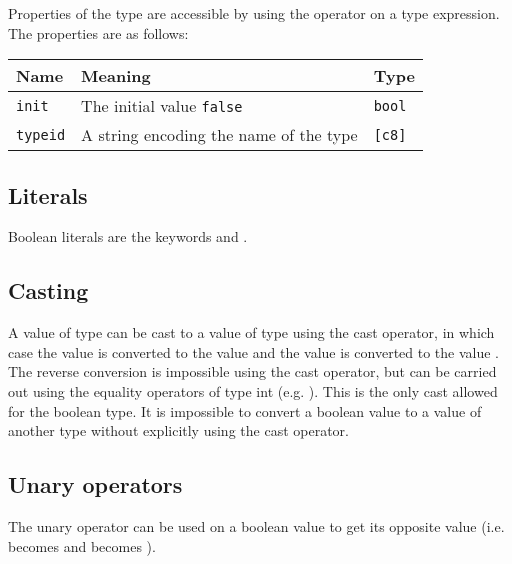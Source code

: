 Properties of the type  are accessible by using the operator
\token{::} on a type expression. The properties are as follows:

\begin{center}
  \vspace{-5pt}
  \begin{adjustbox}{max width=\linewidth}
    \begin{tabular}{|l|ll|}
      \hline
      Name & Meaning & Type\\[0pt]
      \hline
      \hline
      \texttt{init} & The initial value \texttt{false} & \texttt{bool}\\[0pt]
      \hline
      \texttt{typeid} & A string encoding the name of the type & \texttt{[c8]}\\[0pt]
      \hline
    \end{tabular}
  \end{adjustbox}
\end{center}

\subsection{Literals}
\label{sec:org7620b9c}

Boolean literals are the keywords  and .

\subsection{Casting}
\label{sec:org7cd1f94}

A value of type  can be cast to a value of type  using
the cast operator, in which case the value  is converted to the
value  and the value  is converted to the value
. The reverse conversion is impossible using the cast operator, but
can be carried out using the equality operators of type int (e.g. ). This is the only cast allowed for the boolean type. It is impossible to
convert a boolean value to a value of another type without explicitly using the
cast operator.

\subsection{Unary operators}
\label{sec:orgb412ce4}

The unary operator \token{!} can be used on a boolean value to get its opposite
value (i.e.  becomes  and  becomes
).

